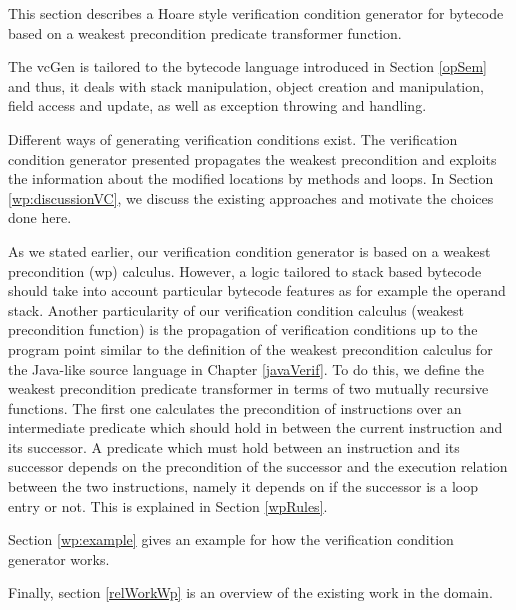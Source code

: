 
This section describes a Hoare style verification condition generator for bytecode based on a weakest precondition predicate transformer function.
 

The vcGen is tailored to the bytecode language introduced in Section \ref{opSem} and thus, it deals
with stack manipulation, object creation and manipulation, field access and update, as well as exception throwing and handling.

Different ways of generating verification conditions exist. The verification condition
 generator presented  propagates the weakest precondition and exploits the information 
about the modified locations by methods and loops. 
In Section \ref{wp:discussionVC}, we discuss the existing approaches and motivate the choices done here.




As we stated earlier, our verification condition generator is based on a weakest precondition (wp) calculus.
 However, a logic tailored to stack based bytecode should take into account 
particular bytecode features as for example the operand stack. Another particularity of our verification condition calculus (weakest precondition function)
is the propagation of verification conditions up to the program point similar to the definition of the weakest precondition calculus
for the Java-like  source language in Chapter \ref{javaVerif}. To do this, we define the  weakest precondition predicate transformer
in terms of two mutually recursive functions. 
The first one calculates the precondition of instructions over an intermediate predicate which should hold 
in between the current instruction and 
its successor. A predicate which must hold between an instruction and its successor 
depends on the precondition of the successor and the execution relation between the two instructions, namely 
it depends on if the successor is a loop entry or not.
This is explained in Section  \ref{wpRules}. 

Section \ref{wp:example} gives an example for how the verification condition generator works.

Finally, section \ref{relWorkWp} is an overview of the existing work in the domain.
 





 
